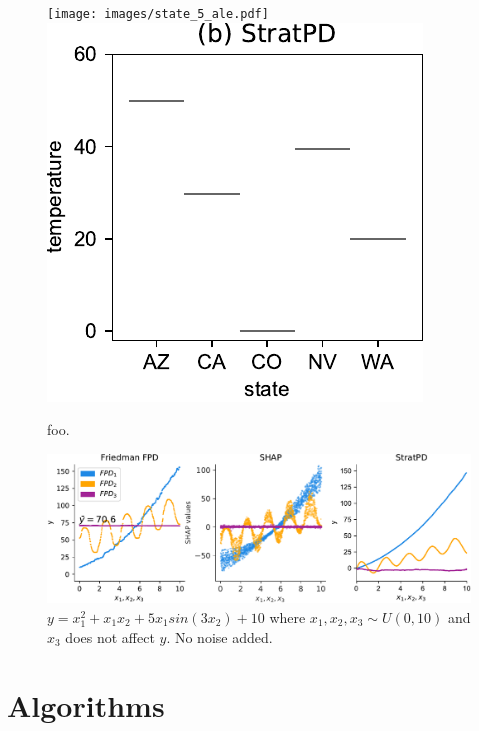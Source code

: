 \documentclass{article}
\begin{document}
\begin{figure}[htbp]
\begin{center}
\texttt{[image: images/state\_5\_ale.pdf]}~~
\includegraphics[scale=0.4]{images/state_vs_temp_stratpd.pdf}~~
\caption{\small foo.}
\label{fig:shap-weight}
\end{center}
\end{figure}

\begin{figure}[htbp]
\begin{center}
\includegraphics[scale=0.4]{images/interactions.pdf}
\caption{\small $y = x_1^2 + x_1 x_2 + 5 x_1 sin(3 x_2) + 10$ where $x_1,x_2,x_3 \sim U(0,10)$ and $x_3$ does not affect $y$. No noise added.}
\label{fig:shap-weight}
\end{center}
\end{figure}


\pagebreak
\section{Algorithms}
\end{document}
